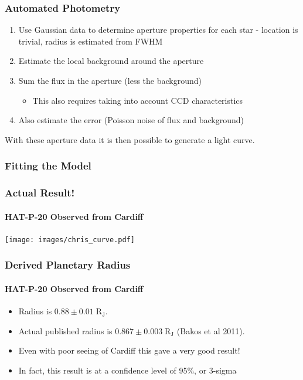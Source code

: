 \documentclass{beamer}
\providecommand{\units}[1]{\;\mathrm{#1}}
\providecommand{\RJ}{\ensuremath{\units{R_J}}}
\begin{document}
  \begin{frame}
  \frametitle{Automated Photometry}
  \begin{enumerate}
  \item Use Gaussian data to determine aperture properties for each star - location is trivial, radius is estimated from FWHM
  \item Estimate the local background around the aperture
  \item Sum the flux in the aperture (less the background)
  \begin{itemize}
    \item This also requires taking into account CCD characteristics
  \end{itemize}
  \item Also estimate the error (Poisson noise of flux and background)
  \end{enumerate}
  With these aperture data it is then possible to generate a light curve.
  \end{frame}
   \begin{frame}
    \frametitle{Fitting the Model}
  \end{frame}
  \begin{frame}
  \frametitle{Actual Result!}
  \framesubtitle{HAT-P-20 Observed from Cardiff}
  \begin{center}
        \texttt{[image: images/chris\_curve.pdf]}
  \end{center}
  \end{frame}
  \begin{frame}
    \frametitle{Derived Planetary Radius}
    \framesubtitle{HAT-P-20 Observed from Cardiff}
    \begin{itemize}
    \item Radius is $0.88\pm0.01\RJ$.
    \item Actual published radius is $0.867\pm0.003\RJ$ (Bakos et al 2011).
    \item Even with poor seeing of Cardiff this gave a very good result!
    \item In fact, this result is at a confidence level of 95\%, or 3-sigma
    \end{itemize}
  \end{frame}
\end{document}
